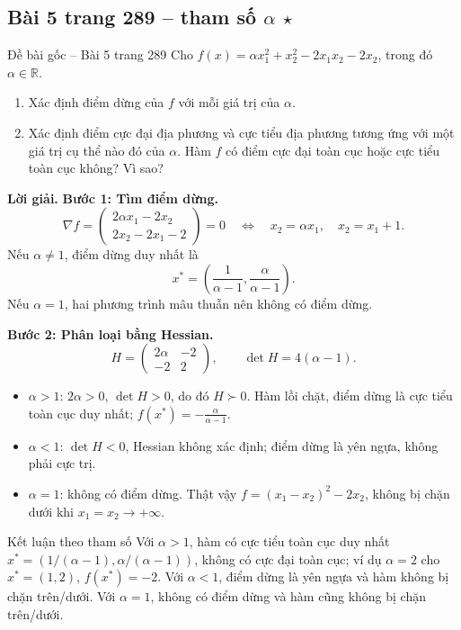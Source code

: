 \documentclass[11pt,a4paper]{article}
\newcommand{\R}{\mathbb{R}}
\newcommand{\grad}{\nabla}
\begin{document}
\subsection{Bài 5 trang 289 -- tham số \(\alpha\) \(\star\)}
\begin{questionbox}{Đề bài gốc -- Bài 5 trang 289}
Cho \(f(x)=\alpha x_1^2+x_2^2-2x_1x_2-2x_2\), trong đó \(\alpha\in\R\).
\begin{enumerate}[label=\roman*),nosep,leftmargin=*]
\item Xác định điểm dừng của \(f\) với mỗi giá trị của \(\alpha\).
\item Xác định điểm cực đại địa phương và cực tiểu địa phương tương ứng với một giá trị cụ thể nào đó của \(\alpha\). Hàm \(f\) có điểm cực đại toàn cục hoặc cực tiểu toàn cục không? Vì sao?
\end{enumerate}
\end{questionbox}
\textbf{Lời giải.} \textbf{Bước 1: Tìm điểm dừng.}
\[
\grad f=
\begin{pmatrix}2\alpha x_1-2x_2\\2x_2-2x_1-2\end{pmatrix}=0
\quad\Longleftrightarrow\quad
x_2=\alpha x_1,\quad x_2=x_1+1.
\]
Nếu \(\alpha\ne1\), điểm dừng duy nhất là
\[
x^\ast=\left(\frac1{\alpha-1},\frac{\alpha}{\alpha-1}\right).
\]
Nếu \(\alpha=1\), hai phương trình mâu thuẫn nên không có điểm dừng.

\textbf{Bước 2: Phân loại bằng Hessian.}
\[
H=\begin{pmatrix}2\alpha&-2\\-2&2\end{pmatrix},
\qquad \det H=4(\alpha-1).
\]
\begin{itemize}
\item \(\alpha>1\): \(2\alpha>0\), \(\det H>0\), do đó \(H\succ0\). Hàm lồi chặt, điểm dừng là cực tiểu toàn cục duy nhất; \(f(x^\ast)=-\frac{\alpha}{\alpha-1}\).
\item \(\alpha<1\): \(\det H<0\), Hessian không xác định; điểm dừng là yên ngựa, không phải cực trị.
\item \(\alpha=1\): không có điểm dừng. Thật vậy \(f=(x_1-x_2)^2-2x_2\), không bị chặn dưới khi \(x_1=x_2\to+\infty\).
\end{itemize}

\begin{answerbox}{Kết luận theo tham số}
Với \(\alpha>1\), hàm có cực tiểu toàn cục duy nhất \(x^\ast=(1/(\alpha-1),\alpha/(\alpha-1))\), không có cực đại toàn cục; ví dụ \(\alpha=2\) cho \(x^\ast=(1,2)\), \(f(x^\ast)=-2\). Với \(\alpha<1\), điểm dừng là yên ngựa và hàm không bị chặn trên/dưới. Với \(\alpha=1\), không có điểm dừng và hàm cũng không bị chặn trên/dưới.
\end{answerbox}
\end{document}
